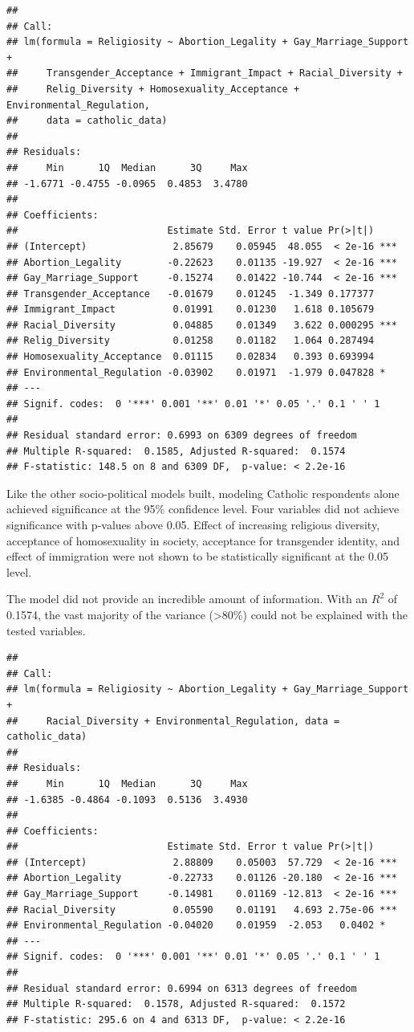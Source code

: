 \documentclass[
]{article}
\begin{document}
\begin{verbatim}
## 
## Call:
## lm(formula = Religiosity ~ Abortion_Legality + Gay_Marriage_Support + 
##     Transgender_Acceptance + Immigrant_Impact + Racial_Diversity + 
##     Relig_Diversity + Homosexuality_Acceptance + Environmental_Regulation, 
##     data = catholic_data)
## 
## Residuals:
##     Min      1Q  Median      3Q     Max 
## -1.6771 -0.4755 -0.0965  0.4853  3.4780 
## 
## Coefficients:
##                          Estimate Std. Error t value Pr(>|t|)    
## (Intercept)               2.85679    0.05945  48.055  < 2e-16 ***
## Abortion_Legality        -0.22623    0.01135 -19.927  < 2e-16 ***
## Gay_Marriage_Support     -0.15274    0.01422 -10.744  < 2e-16 ***
## Transgender_Acceptance   -0.01679    0.01245  -1.349 0.177377    
## Immigrant_Impact          0.01991    0.01230   1.618 0.105679    
## Racial_Diversity          0.04885    0.01349   3.622 0.000295 ***
## Relig_Diversity           0.01258    0.01182   1.064 0.287494    
## Homosexuality_Acceptance  0.01115    0.02834   0.393 0.693994    
## Environmental_Regulation -0.03902    0.01971  -1.979 0.047828 *  
## ---
## Signif. codes:  0 '***' 0.001 '**' 0.01 '*' 0.05 '.' 0.1 ' ' 1
## 
## Residual standard error: 0.6993 on 6309 degrees of freedom
## Multiple R-squared:  0.1585, Adjusted R-squared:  0.1574 
## F-statistic: 148.5 on 8 and 6309 DF,  p-value: < 2.2e-16
\end{verbatim}

Like the other socio-political models built, modeling Catholic
respondents alone achieved significance at the 95\% confidence level.
Four variables did not achieve significance with p-values above 0.05.
Effect of increasing religious diversity, acceptance of homosexuality in
society, acceptance for transgender identity, and effect of immigration
were not shown to be statistically significant at the 0.05 level.

The model did not provide an incredible amount of information. With an
\(R^2\) of 0.1574, the vast majority of the variance (\textgreater80\%)
could not be explained with the tested variables.

\begin{verbatim}
## 
## Call:
## lm(formula = Religiosity ~ Abortion_Legality + Gay_Marriage_Support + 
##     Racial_Diversity + Environmental_Regulation, data = catholic_data)
## 
## Residuals:
##     Min      1Q  Median      3Q     Max 
## -1.6385 -0.4864 -0.1093  0.5136  3.4930 
## 
## Coefficients:
##                          Estimate Std. Error t value Pr(>|t|)    
## (Intercept)               2.88809    0.05003  57.729  < 2e-16 ***
## Abortion_Legality        -0.22733    0.01126 -20.180  < 2e-16 ***
## Gay_Marriage_Support     -0.14981    0.01169 -12.813  < 2e-16 ***
## Racial_Diversity          0.05590    0.01191   4.693 2.75e-06 ***
## Environmental_Regulation -0.04020    0.01959  -2.053   0.0402 *  
## ---
## Signif. codes:  0 '***' 0.001 '**' 0.01 '*' 0.05 '.' 0.1 ' ' 1
## 
## Residual standard error: 0.6994 on 6313 degrees of freedom
## Multiple R-squared:  0.1578, Adjusted R-squared:  0.1572 
## F-statistic: 295.6 on 4 and 6313 DF,  p-value: < 2.2e-16
\end{verbatim}
\end{document}
